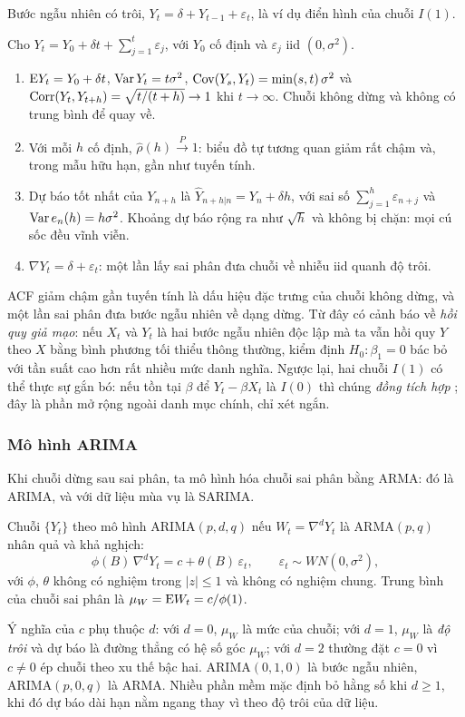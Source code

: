 Bước ngẫu nhiên có trôi, $Y_t=\delta+Y_{t-1}+\varepsilon_t$, là ví dụ điển hình của chuỗi $I(1)$.
\begin{kq}
Cho $Y_t=Y_0+\delta t+\sum_{j=1}^{t}\varepsilon_j$, với $Y_0$ cố định và $\varepsilon_j$ iid $(0,\sigma^2)$.
\begin{enumerate}[label=(\roman*),leftmargin=*,itemsep=1pt]
\item $\mathrm{E} Y_t=Y_0+\delta t$, $\operatorname{Var} Y_t=t\sigma^2$, $\operatorname{Cov}(Y_s,Y_t)=\min(s,t)\,\sigma^2$ và $\operatorname{Corr}(Y_t,Y_{t+h})=\sqrt{t/(t+h)}\to1$ khi $t\to\infty$. Chuỗi không dừng và không có trung bình để quay về.
\item Với mỗi $h$ cố định, $\hat\rho(h)\xrightarrow{P}1$: biểu đồ tự tương quan giảm rất chậm và, trong mẫu hữu hạn, gần như tuyến tính.
\item Dự báo tốt nhất của $Y_{n+h}$ là $\hat Y_{n+h|n}=Y_n+\delta h$, với sai số $\sum_{j=1}^h\varepsilon_{n+j}$ và $\operatorname{Var} e_n(h)=h\sigma^2$. Khoảng dự báo rộng ra như $\sqrt h$ và không bị chặn: mọi cú sốc đều vĩnh viễn.
\item $\nabla Y_t=\delta+\varepsilon_t$: một lần lấy sai phân đưa chuỗi về nhiễu iid quanh độ trôi.
\end{enumerate}
\end{kq}
ACF giảm chậm gần tuyến tính là dấu hiệu đặc trưng của chuỗi không dừng, và một lần sai phân đưa bước ngẫu nhiên về dạng dừng. Từ đây có cảnh báo về \emph{hồi quy giả mạo}: nếu $X_t$ và $Y_t$ là hai bước ngẫu nhiên độc lập mà ta vẫn hồi quy $Y$ theo $X$ bằng bình phương tối thiểu thông thường, kiểm định $H_0:\beta_1=0$ bác bỏ với tần suất cao hơn rất nhiều mức danh nghĩa. Ngược lại, hai chuỗi $I(1)$ có thể thực sự gắn bó: nếu tồn tại $\beta$ để $Y_t-\beta X_t$ là $I(0)$ thì chúng \emph{đồng tích hợp} ; đây là phần mở rộng ngoài danh mục chính, chỉ xét ngắn.


\subsubsection{Mô hình ARIMA}

Khi chuỗi dừng sau sai phân, ta mô hình hóa chuỗi sai phân bằng ARMA: đó là ARIMA, và với dữ liệu mùa vụ là SARIMA.

\begin{kq}
Chuỗi $\{Y_t\}$ theo mô hình ARIMA$(p,d,q)$ nếu $W_t=\nabla^dY_t$ là ARMA$(p,q)$ nhân quả và khả nghịch:
\[
\phi(B)\,\nabla^dY_t=c+\theta(B)\,\varepsilon_t,\qquad \varepsilon_t\sim WN(0,\sigma^2),
\]
với $\phi$, $\theta$ không có nghiệm trong $|z|\le1$ và không có nghiệm chung. Trung bình của chuỗi sai phân là $\mu_W=\mathrm{E} W_t=c/\phi(1)$.
\end{kq}
Ý nghĩa của $c$ phụ thuộc $d$: với $d=0$, $\mu_W$ là mức của chuỗi; với $d=1$, $\mu_W$ là \emph{độ trôi} và dự báo là đường thẳng có hệ số góc $\mu_W$; với $d=2$ thường đặt $c=0$ vì $c\ne0$ ép chuỗi theo xu thế bậc hai. ARIMA$(0,1,0)$ là bước ngẫu nhiên, ARIMA$(p,0,q)$ là ARMA. Nhiều phần mềm mặc định bỏ hằng số khi $d\ge1$, khi đó dự báo dài hạn nằm ngang thay vì theo độ trôi của dữ liệu.

